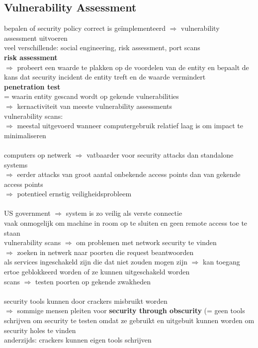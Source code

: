 \documentclass{report}
\begin{document}
\subsection{Vulnerability Assessment}
bepalen of security policy correct is ge\"implementeerd $\Rightarrow$ vulnerability assessment uitvoeren
\\veel verschillende: social engineering, risk assessment, port scans
\\\textbf{risk assessment} 
\\$\Rightarrow$ probeert een waarde te plakken op de voordelen van de entity en bepaalt de kans dat security incident de entity treft en de waarde vermindert
\\\textbf{penetration test}
\\= waarin entity gescand wordt op gekende vulnerabilities
\\ $\Rightarrow$ kernactiviteit van meeste vulnerability assessments
\\vulnerability scans:
\\$\Rightarrow$ meestal uitgevoerd wanneer computergebruik relatief laag is om impact te minimaliseren
\\
\\computers op netwerk $\Rightarrow$ vatbaarder voor security attacks dan standalone systems
\\$\Rightarrow$ eerder attacks van groot aantal onbekende access points dan van gekende access points 
\\$\Rightarrow$ potentieel ernstig veiligheidsprobleem
\\
\\US government $\Rightarrow$ system is zo veilig als verste connectie
\\vaak onmogelijk om machine in room op te sluiten en geen remote access toe te staan
\\vulnerability scans $\Rightarrow$ om problemen met network security te vinden
\\$\Rightarrow$ zoeken in netwerk naar poorten die request beantwoorden
\\als services ingeschakeld zijn die dat niet zouden mogen zijn $\Rightarrow$ kan toegang ertoe geblokkeerd worden of ze kunnen uitgeschakeld worden
\\scans $\Rightarrow$ testen poorten op gekende zwakheden 
\\
\\security tools kunnen door crackers misbruikt worden
\\$\Rightarrow$ sommige mensen pleiten voor \textbf{security through obscurity} (= geen tools schrijven om security te testen omdat ze gebruikt en uitgebuit kunnen worden om security holes te vinden
\\anderzijds: crackers kunnen eigen tools schrijven
\end{document}
